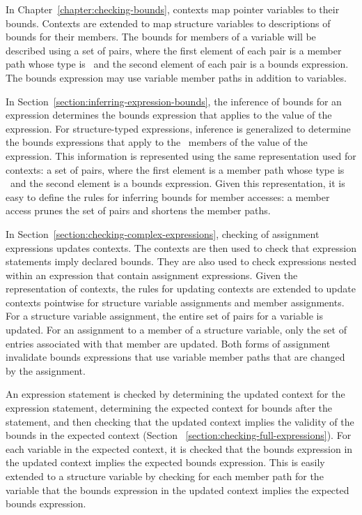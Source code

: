 In Chapter~\ref{chapter:checking-bounds}, contexts map pointer variables to their bounds.
Contexts are extended to map structure variables to descriptions of bounds for their
members.  The bounds for members of a variable will be described using a set of pairs,
where the first element of each pair is a member path whose type is \arrayptr\
and the second element of each pair is a bounds expression.  The bounds expression may use 
variable member paths in addition to variables.

In Section~\ref{section:inferring-expression-bounds}, the inference of bounds for an
expression determines the bounds expression that applies to the value of the
expression.  For structure-typed expressions, inference is generalized to determine
the bounds expressions that apply to the \arrayptr\ members of the value 
of the expression.  This information is represented using the same
representation used for contexts: a set of pairs, where the first element 
is a member path whose type is \arrayptr\ and the second element is a 
bounds expression.  Given this representation, it is easy to define
the rules for inferring bounds for member accesses: a member access prunes the
set of pairs and shortens the member paths.

In Section~\ref{section:checking-complex-expressions}, checking of assignment
expressions updates contexts.  The contexts are then used to check that expression
statements imply declared bounds.  They are also used to check expressions nested
within an expression that contain assignment expressions. 
Given the representation of contexts, the rules for updating contexts
are extended to update contexts pointwise for structure variable assignments and member 
assignments.  For a structure variable assignment, the entire set of pairs for a
variable is updated.  For an assignment to a member of a  structure variable,
only the set of entries  associated with that member are updated.  Both forms of assignment
invalidate bounds expressions that use variable member paths that are changed by the
assignment.

An expression statement is checked by determining the updated context for the
expression statement, determining the expected context for bounds after 
the statement, and then checking that the updated context implies the
validity of the bounds in the expected context (Section ~\ref{section:checking-full-expressions}).
For each variable in the expected context, it is checked that the bounds expression in
the updated context implies the expected bounds expression.  This is easily 
extended to a structure variable by checking for each member path for 
the variable that the bounds expression in the updated context implies
the expected bounds expression.

